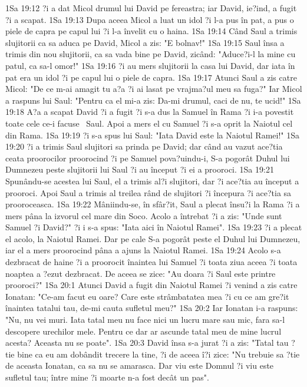 1Sa 19:12  ?i a dat Micol drumul lui David pe fereastra; iar David, ie?ind, a fugit ?i a scapat.
1Sa 19:13  Dupa aceea Micol a luat un idol ?i l-a pus în pat, a pus o piele de capra pe capul lui ?i l-a învelit cu o haina.
1Sa 19:14  Când Saul a trimis slujitorii ca sa aduca pe David, Micol a zis: "E bolnav!"
1Sa 19:15  Saul însa a trimis din nou slujitorii, ca sa vada bine pe David, zicând: "Aduce?i-l la mine cu patul, ca sa-l omor!"
1Sa 19:16  ?i au mers slujitorii la casa lui David, dar iata în pat era un idol ?i pe capul lui o piele de capra.
1Sa 19:17  Atunci Saul a zis catre Micol: "De ce m-ai amagit tu a?a ?i ai lasat pe vrajma?ul meu sa fuga?" Iar Micol a raspuns lui Saul: "Pentru ca el mi-a zis: Da-mi drumul, caci de nu, te ucid!"
1Sa 19:18  A?a a scapat David ?i a fugit ?i s-a dus la Samuel în Rama ?i i-a povestit toate cele ce-i facuse  Saul. Apoi a mers el cu Samuel ?i s-a oprit la Naiotul cel din Rama.
1Sa 19:19  ?i s-a spus lui Saul: "Iata David este la Naiotul Ramei!"
1Sa 19:20  ?i a trimis Saul slujitori sa prinda pe David; dar când au vazut ace?tia ceata proorocilor proorocind ?i pe Samuel pova?uindu-i, S-a pogorât Duhul lui Dumnezeu peste slujitorii lui Saul ?i au început ?i ei a prooroci.
1Sa 19:21  Spunându-se acestea lui Saul, el a trimis al?i slujitori, dar ?i ace?tia au început a prooroci. Apoi Saul a trimis al treilea rând de slujitori ?i începura ?i ace?tia sa prooroceasca.
1Sa 19:22  Mâniindu-se, în sfâr?it, Saul a plecat însu?i la Rama ?i a mers pâna la izvorul cel mare din Soco. Acolo a întrebat ?i a zis: "Unde sunt Samuel ?i David?" ?i i s-a spus: "Iata aici în Naiotul Ramei".
1Sa 19:23  ?i a plecat el acolo, la Naiotul Ramei. Dar pe cale S-a pogorât peste el Duhul lui Dumnezeu, iar el a mers proorocind pâna a ajuns la Naiotul Ramei.
1Sa 19:24  Acolo s-a dezbracat de haine ?i a proorocit înaintea lui Samuel ?i toata ziua aceea ?i toata noaptea a ?ezut dezbracat. De aceea se zice: "Au doara ?i Saul este printre prooroci?"
1Sa 20:1  Atunci David a fugit din Naiotul Ramei ?i venind a zis catre Ionatan: "Ce-am facut eu oare? Care este strâmbatatea mea ?i cu ce am gre?it înaintea tatalui tau, de-mi cauta sufletul meu?"
1Sa 20:2  Iar Ionatan i-a raspuns: "Nu, nu vei muri. Iata tatal meu nu face nici un lucru mare sau mic, fara sa-l descopere urechilor mele. Pentru ce dar ar ascunde tatal meu de mine lucrul acesta? Aceasta nu se poate".
1Sa 20:3  David însa s-a jurat ?i a zis: "Tatal tau ?tie bine ca eu am dobândit trecere la tine, ?i de aceea î?i zice: "Nu trebuie sa ?tie de aceasta Ionatan, ca sa nu se amarasca. Dar viu este Domnul ?i viu este sufletul tau; între mine ?i moarte n-a fost decât un pas".
